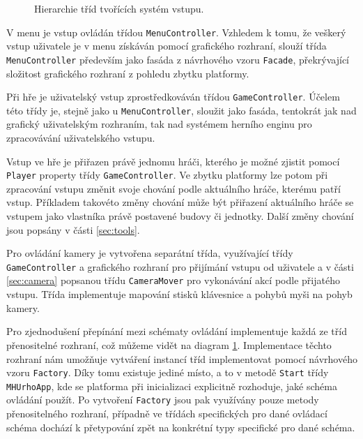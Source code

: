 \begin{figure}[h]
	\centering
	\fontsize{7pt}{10pt}\selectfont
	\def\svgwidth{\textwidth}
	
	\caption{Hierarchie tříd tvořících systém vstupu.}
	\label{fig:inputhier}
\end{figure}


V menu je vstup ovládán třídou \texttt{MenuController}. Vzhledem k tomu, že veškerý vstup uživatele je v menu získáván pomocí grafického rozhraní, slouží třída \texttt{MenuController} především jako fasáda z návrhového vzoru \texttt{Facade}, překrývající složitost grafického rozhraní z pohledu zbytku platformy. 

Při hře je uživatelský vstup zprostředkováván třídou \texttt{GameController}. Účelem této třídy je, stejně jako u \texttt{MenuController}, sloužit jako fasáda, tentokrát jak nad grafický uživatelským rozhraním, tak nad systémem herního enginu pro zpracovávání uživatelského vstupu. 

Vstup ve hře je přiřazen právě jednomu hráči, kterého je možné zjistit pomocí \texttt{Player} property třídy \texttt{GameController}. Ve zbytku platformy lze potom při zpracování vstupu změnit svoje chování podle aktuálního hráče, kterému patří vstup. Příkladem takovéto změny chování může být přiřazení aktuálního hráče se vstupem jako vlastníka právě postavené budovy či jednotky. Další změny chování jsou popsány v části \ref{sec:tools}.

Pro ovládání kamery je vytvořena separátní třída, využívající třídy \texttt{GameController} a grafického rozhraní pro přijímání vstupu od uživatele a v části \ref{sec:camera} popsanou třídu \texttt{CameraMover} pro vykonávání akcí podle přijatého vstupu. Třída implementuje mapování stisků klávesnice a pohybů myši na pohyb kamery.

Pro zjednodušení přepínání mezi schématy ovládání implementuje každá ze tříd přenositelné rozhraní, což můžeme vidět na diagram \ref{fig:inputhier}. Implementace těchto rozhraní nám umožňuje vytváření instancí tříd implementovat pomocí návrhového vzoru \texttt{Factory}. Díky tomu existuje jediné místo, a to v metodě \texttt{Start} třídy \texttt{MHUrhoApp}, kde se platforma při inicializaci explicitně rozhoduje, jaké schéma ovládání použít. Po vytvoření \texttt{Factory} jsou pak využívány pouze metody přenositelného rozhraní, případně ve třídách specifických pro dané ovládací schéma dochází k přetypování zpět na konkrétní typy specifické pro dané schéma.

